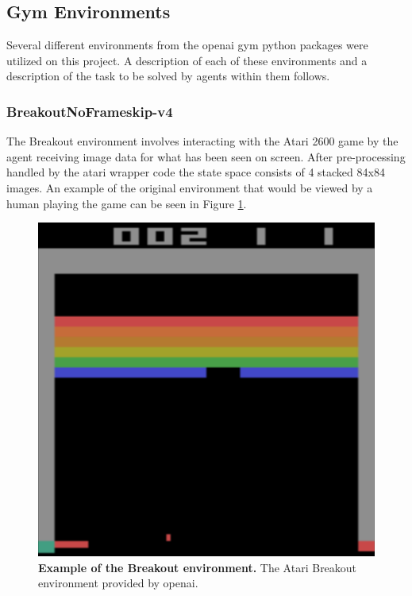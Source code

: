 \documentclass[conference]{IEEEtran}
\begin{document}
\subsection{Gym Environments}
Several different environments from the openai gym python packages were utilized on this project.
A description of each of these environments and a description of the task to be solved by agents within them follows.

\subsubsection{BreakoutNoFrameskip-v4}
The Breakout environment involves interacting with the Atari 2600 game by the agent receiving image data for what has been seen on screen.
After pre-processing handled by the atari wrapper code the state space consists of 4 stacked 84x84 images.
An example of the original environment that would be viewed by a human playing the game can be seen in Figure \ref{fig:atariBreakoutEnvironment}.

\begin{figure}[htbp]
\centerline{\includegraphics[scale=0.1]{atari_breakout_sample.png}}
\caption{\textbf{Example of the Breakout environment.}  The Atari Breakout environment provided by openai.}
\label{fig:atariBreakoutEnvironment}
\end{figure}
\end{document}
